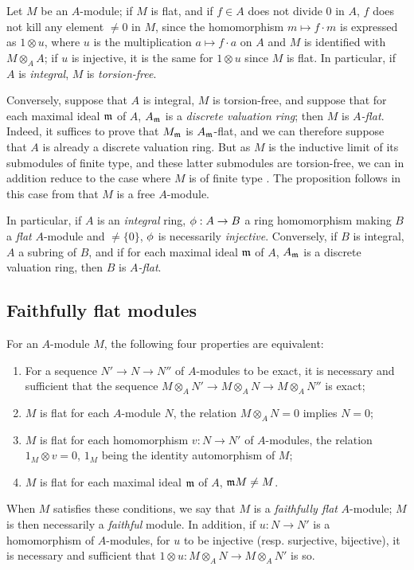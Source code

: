 \begin{env}[6.3.4]
\label{0.6.3.4}
Let $M$ be an $A$-module; if $M$ is flat, and if $f\in A$ does not divide $0$ in $A$, $f$
does not kill any element $\neq 0$ in $M$, since the homomorphism $m\mapsto f\cdot m$ is
expressed as $1\otimes u$, where $u$ is the multiplication $a\mapsto f\cdot a$ on $A$ and
$M$ is identified with $M\otimes_A A$; if $u$ is injective, it is the same for $1\otimes u$
since $M$ is flat. In particular, if $A$ is \emph{integral}, $M$ is \emph{torsion-free}.

Conversely, suppose that $A$ is integral, $M$ is torsion-free, and suppose that for each
maximal ideal $\mathfrak{m}$ of $A$, $A_\mathfrak{m}$ is a \emph{discrete valuation ring};
then $M$ is \emph{$A$-flat}. Indeed, it suffices  to prove that
$M_\mathfrak{m}$ is $A_\mathfrak{m}$-flat, and we can therefore suppose that $A$ is already
a discrete valuation ring. But as $M$ is the inductive limit of its submodules of finite
type, and these latter submodules are torsion-free, we can in addition reduce to the case
where $M$ is of finite type . The proposition follows in this
case from that $M$ is a free $A$-module.

In particular, if $A$ is an \emph{integral} ring, $\vphi:A\to B$ a ring homomorphism making
$B$ a \emph{flat} $A$-module and $\neq\{0\}$, $\phi$ is necessarily \emph{injective}.
Conversely, if $B$ is integral, $A$ a subring of $B$, and if for each maximal ideal
$\mathfrak{m}$ of $A$, $A_\mathfrak{m}$ is a discrete valuation ring, then $B$ is
\emph{$A$-flat}.
\end{env}

\subsection{Faithfully flat modules}
\label{subsection:faithfully-flat-modules}

\begin{env}[6.4.1]
\label{0.6.4.1}
For an $A$-module $M$, the following four properties are equivalent:
\begin{enumerate}[label=(\alph*)]
  \item For a sequence $N'\to N\to N''$ of $A$-modules to be exact, it is necessary and
    sufficient that the sequence $M\otimes_A N'\to M\otimes_A N\to M\otimes_A N''$ is exact;
  \item $M$ is flat for each $A$-module $N$, the relation $M\otimes_A N=0$ implies $N=0$;
  \item $M$ is flat for each homomorphism $v:N\to N'$ of $A$-modules, the relation
    $1_M\otimes v=0$, $1_M$ being the identity automorphism of $M$;
  \item $M$ is flat for each maximal ideal $\mathfrak{m}$ of $A$, $\mathfrak{m}M\neq M$.
\end{enumerate}

When $M$ satisfies these conditions, we say that $M$ is a \emph{faithfully flat} $A$-module;
$M$ is then necessarily a \emph{faithful} module. In addition, if $u:N\to N'$ is a
homomorphism of $A$-modules, for $u$ to be injective (resp. surjective, bijective), it is
necessary and sufficient that $1\otimes u:M\otimes_A N\to M\otimes_A N'$ is so.
\end{env}

